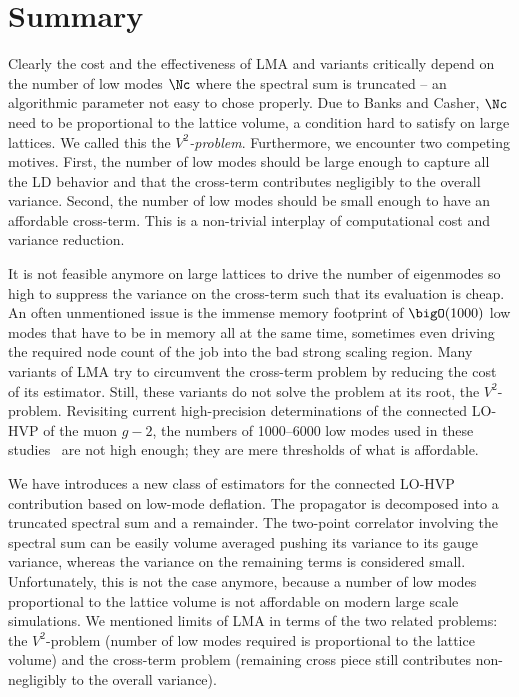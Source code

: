 \section{Summary}
\label{sec:lma:summary}

Clearly the cost and the effectiveness of LMA and variants critically depend on the number of low modes $\Nc$ where the spectral sum is truncated -- an algorithmic parameter not easy to chose properly.
Due to Banks and Casher\cite{banks1980}, $\Nc$ need to be proportional to the lattice volume, a condition hard to satisfy on large lattices.
We called this the \emph{$V^{2}$-problem}.
Furthermore, we encounter two competing motives.
First, the number of low modes should be large enough to capture all the LD behavior and that the cross-term contributes negligibly to the overall variance.
Second, the number of low modes should be small enough to have an affordable cross-term.
This is a non-trivial interplay of computational cost and variance reduction.

It is not feasible anymore on large lattices to drive the number of eigenmodes so high to suppress the variance on the cross-term such that its evaluation is cheap.
An often unmentioned issue is the immense memory footprint of $\bigO(1000)$ low modes that have to be in memory all at the same time, sometimes even driving the required node count of the job into the bad strong scaling region.
Many variants of LMA try to circumvent the cross-term problem by reducing the cost of its estimator.
Still, these variants do not solve the problem at its root, the $V^2$-problem.
Revisiting current high-precision determinations of the connected LO-HVP of the muon $g-2$, the numbers of \numrange{1000}{6000} low modes used in these studies~\cite{Djukanovic:2024cmq,RBC_2024,bmw_2024,Aubin:2022hgm} are not high enough; they are mere thresholds of what is affordable.

We have introduces a new class of estimators for the connected LO-HVP contribution based on low-mode deflation.
The propagator is decomposed into a truncated spectral sum and a remainder.
The two-point correlator involving the spectral sum can be easily volume averaged pushing its variance to its gauge variance, whereas the variance on the remaining terms is considered small.
Unfortunately, this is not the case anymore, because a number of low modes proportional to the lattice volume is not affordable on modern large scale simulations.
We mentioned limits of LMA in terms of the two related problems: the $V^2$-problem (number of low modes required is proportional to the lattice volume) and the cross-term problem (remaining cross piece still contributes non-negligibly to the overall variance).

